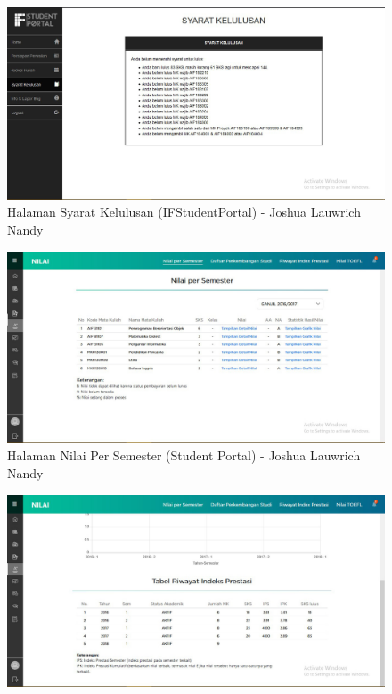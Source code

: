 \begin{itemize}
\begin{enumerate}
		\begin{figure}[H]
			\centering
			\includegraphics[scale=0.45]{Gambar/HasilPengujian/2016_2_syarat_kelulusan_ifstudentportal}
			\caption{Halaman Syarat Kelulusan (IFStudentPortal) - Joshua Lauwrich Nandy}
			\label{fig:2016_2_syarat_kelulusan_ifstudentportal}
		\end{figure}
		\begin{figure}[H]
			\centering
			\includegraphics[scale=0.45]{Gambar/HasilPengujian/2016_2_nps_studentportal}
			\caption{Halaman Nilai Per Semester (Student Portal) - Joshua Lauwrich Nandy}
			\label{fig:2016_2_nps_studentportal}
		\end{figure}
		\begin{figure}[H]
			\centering
			\includegraphics[scale=0.45]{Gambar/HasilPengujian/2016_2_rip_studentportal}

\end{figure}
\end{enumerate}
\end{itemize}

